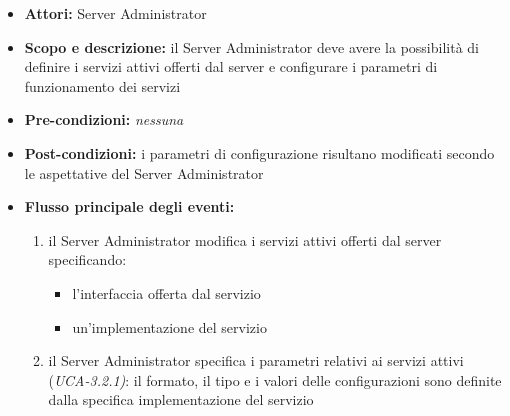 \begin{itemize}
	\item \textbf{Attori:} Server Administrator
	\item \textbf{Scopo e descrizione:} il Server Administrator deve avere la possibilità di definire i servizi attivi offerti dal server e configurare i parametri di funzionamento dei servizi
	\item \textbf{Pre-condizioni:} \emph{nessuna}
	\item \textbf{Post-condizioni:} i parametri di configurazione risultano modificati secondo le aspettative del Server Administrator
	\item \textbf{Flusso principale degli eventi:}
		\begin{enumerate}
			\item il Server Administrator modifica i servizi attivi offerti dal server specificando:
				\begin{itemize}
					\item l'interfaccia offerta dal servizio
					\item un'implementazione del servizio
				\end{itemize}
			\item il Server Administrator specifica i parametri relativi ai servizi attivi (\emph{UCA-3.2.1)}: il formato, il tipo e i valori delle configurazioni sono definite dalla specifica implementazione del servizio
		\end{enumerate}
\end{itemize}





